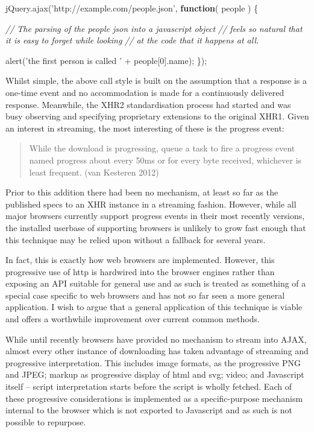 \documentclass[]{article}
\newenvironment{Shaded}{}{}
\newcommand{\KeywordTok}[1]{\textcolor[rgb]{0.00,0.44,0.13}{\textbf{{#1}}}}
\newcommand{\DecValTok}[1]{\textcolor[rgb]{0.25,0.63,0.44}{{#1}}}
\newcommand{\StringTok}[1]{\textcolor[rgb]{0.25,0.44,0.63}{{#1}}}
\newcommand{\CommentTok}[1]{\textcolor[rgb]{0.38,0.63,0.69}{\textit{{#1}}}}
\newcommand{\OtherTok}[1]{\textcolor[rgb]{0.00,0.44,0.13}{{#1}}}
\newcommand{\FunctionTok}[1]{\textcolor[rgb]{0.02,0.16,0.49}{{#1}}}
\newcommand{\NormalTok}[1]{{#1}}
\begin{document}
\begin{Shaded}
\begin{Highlighting}[]
\OtherTok{jQuery}\NormalTok{.}\FunctionTok{ajax}\NormalTok{(}\StringTok{'http://example.com/people.json'}\NormalTok{, }\KeywordTok{function}\NormalTok{( people ) \{}

   \CommentTok{// The parsing of the people json into a javascript object}
   \CommentTok{// feels so natural that it is easy to forget while looking }
   \CommentTok{// at the code that it happens at all. }
   
   \FunctionTok{alert}\NormalTok{(}\StringTok{'the first person is called '} \NormalTok{+ people[}\DecValTok{0}\NormalTok{].}\FunctionTok{name}\NormalTok{);}
\NormalTok{\});}
\end{Highlighting}
\end{Shaded}

Whilst simple, the above call style is built on the assumption that a
response is a one-time event and no accommodation is made for a
continuously delivered response. Meanwhile, the XHR2 standardisation
process had started and was busy observing and specifying proprietary
extensions to the original XHR1. Given an interest in streaming, the
most interesting of these is the progress event:

\begin{quote}
While the download is progressing, queue a task to fire a progress event
named progress about every 50ms or for every byte received, whichever is
least frequent. (van Kesteren 2012)
\end{quote}

Prior to this addition there had been no mechanism, at least so far as
the published specs to an XHR instance in a streaming fashion. However,
while all major browsers currently support progress events in their most
recently versions, the installed userbase of supporting browsers is
unlikely to grow fast enough that this technique may be relied upon
without a fallback for several years.

In fact, this is exactly how web browsers are implemented. However, this
progressive use of http is hardwired into the browser engines rather
than exposing an API suitable for general use and as such is treated as
something of a special case specific to web browsers and has not so far
seen a more general application. I wish to argue that a general
application of this technique is viable and offers a worthwhile
improvement over current common methods.

While until recently browsers have provided no mechanism to stream into
AJAX, almost every other instance of downloading has taken advantage of
streaming and progressive interpretation. This includes image formats,
as the progressive PNG and JPEG; markup as progressive display of html
and svg; video; and Javascript itself -- script interpretation starts
before the script is wholly fetched. Each of these progressive
considerations is implemented as a specific-purpose mechanism internal
to the browser which is not exported to Javascript and as such is not
possible to repurpose.
\end{document}
